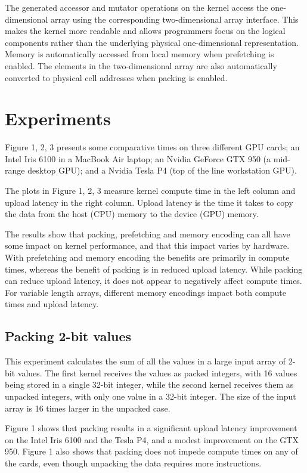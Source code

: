 \documentclass[conference]{IEEEtran}
\begin{document}
The generated accessor and mutator operations on the kernel access the one-dimensional array using the corresponding two-dimensional array interface. This makes the kernel more readable and allows programmers focus on the logical components rather than the underlying physical one-dimensional representation. Memory is automatically accessed from local memory when prefetching is enabled. The elements in the two-dimensional array are also automatically converted to physical cell addresses when packing is enabled.

\section{Experiments}
Figure 1, 2, 3 presents some comparative times on three different GPU cards; an Intel Iris 6100 in a MacBook Air laptop; an Nvidia GeForce GTX 950 (a mid-range desktop GPU); and a Nvidia Tesla P4 (top of the line workstation GPU).

The plots in Figure 1, 2, 3 measure kernel compute time in the left column and upload latency in the right column. Upload latency is the time it takes to copy the data from the host (CPU) memory to the device (GPU) memory.

The results show that packing, prefetching and memory encoding can all have some impact on kernel performance, and that this impact varies by hardware. With prefetching and memory encoding the benefits are primarily in compute times, whereas the benefit of packing is in reduced upload latency. While packing can reduce upload latency, it does not appear to negatively affect compute times. For variable length arrays, different memory encodings impact both compute times and upload latency.

\subsection{Packing 2-bit values}
This experiment calculates the sum of all the values in a large input array of 2-bit values. The first kernel receives the values as packed integers, with 16 values being stored in a single 32-bit integer, while the second kernel receives them as unpacked integers, with only one value in a 32-bit integer. The size of the input array is 16 times larger in the unpacked case.

Figure 1 shows that packing results in a significant upload latency improvement on the Intel Iris 6100 and the Tesla P4, and a modest improvement on the GTX 950. Figure 1 also shows that packing does not impede compute times on any of the cards, even though unpacking the data requires more instructions.
\end{document}
